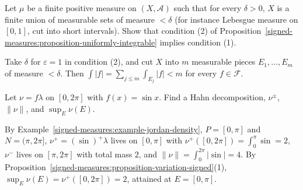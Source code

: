 \begin{exercise}\label{signed-measures:exercise-atomless}
Let $\mu$ be a finite positive measure on $(X, \mathcal{A})$ such that for every $\delta > 0$, $X$ is a finite union of measurable sets of measure $< \delta$ (for instance Lebesgue measure on
$[0, 1]$, cut into short intervals). Show that condition (2) of Proposition~\ref{signed-measures:proposition-uniformly-integrable} implies condition (1).
\end{exercise}

\begin{solution}
Take $\delta$ for $\varepsilon = 1$ in condition (2), and cut $X$ into $m$ measurable pieces $E_1, \ldots, E_m$ of measure $< \delta$. Then $\int|f| = \sum_{j \leq m}\int_{E_j}|f| < m$ for every
$f \in \mathcal{F}$.
\end{solution}

\begin{exercise}\label{signed-measures:exercise-jordan-example}
Let $\nu = f\lambda$ on $[0, 2\pi]$ with $f(x) = \sin x$. Find a Hahn decomposition, $\nu^\pm$, $\|\nu\|$, and $\sup_E\nu(E)$.
\end{exercise}

\begin{solution}
By Example~\ref{signed-measures:example-jordan-density}, $P = [0, \pi]$ and $N = (\pi, 2\pi]$, $\nu^+ = (\sin)^+\lambda$ lives on $[0, \pi]$ with $\nu^+([0, 2\pi]) = \int_0^\pi\sin = 2$, $\nu^-$ lives on
$[\pi, 2\pi]$ with total mass $2$, and $\|\nu\| = \int_0^{2\pi}|\sin| = 4$. By Proposition~\ref{signed-measures:proposition-variation-signed}(1), $\sup_E\nu(E) = \nu^+([0, 2\pi]) = 2$, attained at
$E = [0, \pi]$.
\end{solution}
